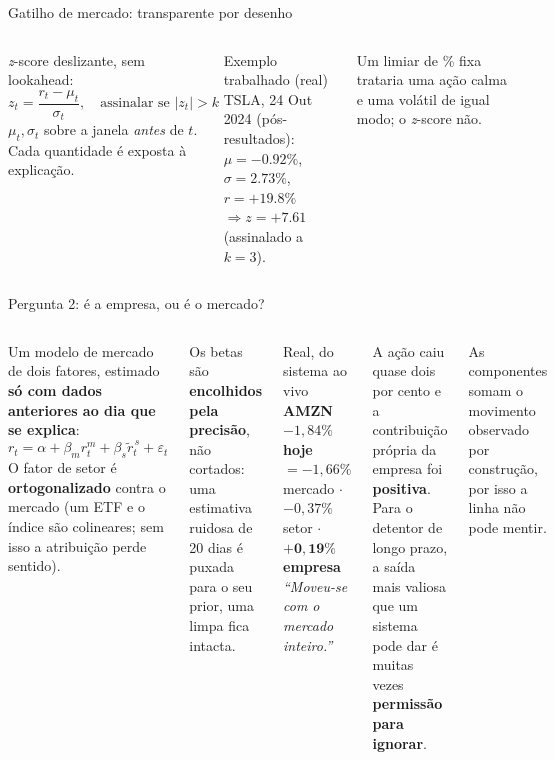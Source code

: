 \documentclass[aspectratio=169]{beamer}
\begin{document}
\begin{frame}{Gatilho de mercado: transparente por desenho}
\begin{columns}
\emph{z}-score deslizante, sem lookahead:
\[ z_t=\frac{r_t-\mu_t}{\sigma_t},\quad \text{assinalar se } |z_t|>k \]
$\mu_t,\sigma_t$ sobre a janela \emph{antes} de $t$. Cada quantidade é exposta à explicação.
\begin{block}{Exemplo trabalhado (real)}
\small TSLA, 24 Out 2024 (pós-resultados):\\
$\mu=-0.92\%$, $\sigma=2.73\%$, $r=+19.8\%$\\
$\Rightarrow z=\mathbf{+7.61}$ (assinalado a $k=3$).
\end{block}
Um limiar de \% fixa trataria uma ação calma e uma volátil de igual modo; o \emph{z}-score não.
\end{columns}
\end{frame}

\begin{frame}{Pergunta 2: é a empresa, ou é o mercado?}
\begin{columns}
\small
Um modelo de mercado de dois fatores, estimado \textbf{só com dados anteriores ao dia que se
explica}:
\[ r_t = \alpha + \beta_m r^{m}_t + \beta_s \tilde r^{\,s}_t + \varepsilon_t \]
O fator de setor é \textbf{ortogonalizado} contra o mercado (um ETF e o índice são colineares;
sem isso a atribuição perde sentido).
\medskip

Os betas são \textbf{encolhidos pela precisão}, não cortados: uma estimativa ruidosa de 20 dias
é puxada para o seu prior, uma limpa fica intacta.
\begin{block}{Real, do sistema ao vivo}
\small
\textbf{AMZN $-1,84\%$ hoje} \\[2pt]
$= -1,66\%$ mercado $\cdot$ $-0,37\%$ setor $\cdot$ $\mathbf{+0,19\%}$ \textbf{empresa} \\[3pt]
\emph{``Moveu-se com o mercado inteiro.''}
\end{block}
{\small A ação caiu quase dois por cento e a contribuição própria da empresa foi
\textbf{positiva}. Para o detentor de longo prazo, a saída mais valiosa que um sistema pode dar
é muitas vezes \textbf{permissão para ignorar}.}
\medskip

{\footnotesize As componentes somam o movimento observado por construção, por isso a linha não
pode mentir.}
\end{columns}
\end{frame}
\end{document}
